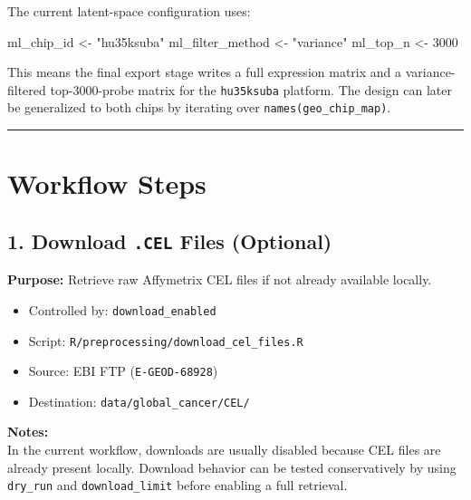 \documentclass[
  letterpaper,
  DIV=11,
  numbers=noendperiod,
  openany,
  oneside]{scrreprt}
\newenvironment{Shaded}{\begin{snugshade}}{\end{snugshade}}
\newcommand{\DecValTok}[1]{\textcolor[rgb]{0.68,0.00,0.00}{#1}}
\newcommand{\NormalTok}[1]{\textcolor[rgb]{0.00,0.23,0.31}{#1}}
\newcommand{\OtherTok}[1]{\textcolor[rgb]{0.00,0.23,0.31}{#1}}
\newcommand{\StringTok}[1]{\textcolor[rgb]{0.13,0.47,0.30}{#1}}
\providecommand{\tightlist}{%
  \setlength{\itemsep}{0pt}\setlength{\parskip}{0pt}}
\begin{document}
The current latent-space configuration uses:

\begin{Shaded}
\begin{Highlighting}[]
\NormalTok{ml\_chip\_id       }\OtherTok{\textless{}{-}} \StringTok{"hu35ksuba"}
\NormalTok{ml\_filter\_method }\OtherTok{\textless{}{-}} \StringTok{"variance"}
\NormalTok{ml\_top\_n         }\OtherTok{\textless{}{-}} \DecValTok{3000}
\end{Highlighting}
\end{Shaded}

This means the final export stage writes a full expression matrix and a
variance-filtered top-3000-probe matrix for the \texttt{hu35ksuba}
platform. The design can later be generalized to both chips by iterating
over \texttt{names(geo\_chip\_map)}.

\begin{center}\rule{0.5\linewidth}{0.5pt}\end{center}

\section*{Workflow Steps}\label{workflow-steps}


\subsection*{\texorpdfstring{1. Download \texttt{.CEL} Files
(Optional)}{1. Download .CEL Files (Optional)}}\label{download-.cel-files-optional}

\textbf{Purpose:} Retrieve raw Affymetrix CEL files if not already
available locally.

\begin{itemize}
\tightlist
\item
  Controlled by: \texttt{download\_enabled}
\item
  Script: \texttt{R/preprocessing/download\_cel\_files.R}
\item
  Source: EBI FTP (\texttt{E-GEOD-68928})
\item
  Destination: \texttt{data/global\_cancer/CEL/}
\end{itemize}

\textbf{Notes:}\\
In the current workflow, downloads are usually disabled because CEL
files are already present locally. Download behavior can be tested
conservatively by using \texttt{dry\_run} and \texttt{download\_limit}
before enabling a full retrieval.
\end{document}
